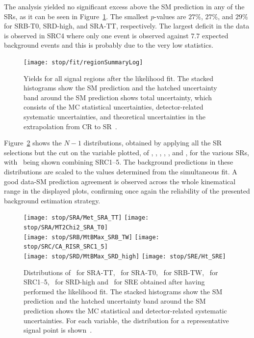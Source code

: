 			The analysis yielded no significant excess above the \ac{SM} prediction in any of the \acp{SR}, as it can be seen in Figure~\ref{fig:srSummary}. The smallest $p$-values are $27\%$, $27\%$, and $29\%$ for SRB-T0, SRD-high, and SRA-TT, respectively. The largest deficit in the data is observed in SRC4 where only one event is observed against $7.7$ expected background events and this is probably due to the very low statistics.

			\begin{figure}[htpb]
			  \begin{center}
			    \texttt{[image: stop/fit/regionSummaryLog]}
			    \caption{Yields for all signal regions after the likelihood fit. The stacked histograms show the SM prediction and the hatched uncertainty band around the SM prediction shows total uncertainty, which consists of the MC statistical uncertainties, detector-related systematic uncertainties, and theoretical uncertainties in the extrapolation from CR to SR~\cite{stop0L}.} 
			    \label{fig:srSummary}
			  \end{center}
			\end{figure}

			Figure~\ref{fig:SRs} shows the $N-1$ distributions, obtained by applying all the \ac{SR} selections but the cut on the variable plotted, of \met, \mttwo, \mtbmax, \mt, \rISR, and \HT, for the various \acp{SR}, with \rISR\ being shown combining SRC1--5. The background predictions in these distributions are scaled to the values determined from the simultaneous fit. A good data-SM prediction agreement is observed across the whole kinematical range in the displayed plots, confirming once again the reliability of the presented background estimation strategy. 

			\begin{figure}[htpb]
			  \begin{center}
			    \texttt{[image: stop/SRA/Met\_SRA\_TT]}
			    \texttt{[image: stop/SRA/MT2Chi2\_SRA\_T0]}\\%
			    \texttt{[image: stop/SRB/MtBMax\_SRB\_TW]}
			    \texttt{[image: stop/SRC/CA\_RISR\_SRC1\_5]}\\%
			    \texttt{[image: stop/SRD/MtBMax\_SRD\_high]}
			    \texttt{[image: stop/SRE/Ht\_SRE]}
			    \caption{Distributions of \met\ for SRA-TT, \mttwo\ for SRA-T0, \mtbmax\ for SRB-TW, \rISR\ for SRC1--5, \mtbmax\ for SRD-high and \HT\ for SRE obtained after having performed the likelihood fit. The stacked histograms show the SM prediction and the hatched uncertainty band around the SM prediction shows the MC statistical and detector-related systematic uncertainties. For each variable, the distribution for a representative signal point is shown~\cite{stop0L}.}
			    \label{fig:SRs}
			  \end{center}
			\end{figure}



